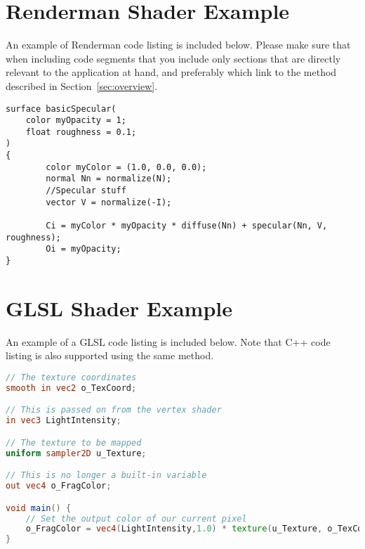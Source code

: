 \documentclass[]{acmsiggraph}
\begin{document}
\section{Renderman Shader Example}\label{app:renderman}
An example of Renderman code listing is included below. Please make sure that when including code segments that you include only sections that are directly relevant to the application at hand, and preferably which link to the method described in Section~\ref{sec:overview}.
\begin{lstlisting}[language=rendermansl, label={lst:renderman}, caption={Renderman example lifted from \protect\cite{renderman16}.}]
surface basicSpecular(
    color myOpacity = 1; 
    float roughness = 0.1;
)
{
        color myColor = (1.0, 0.0, 0.0);
        normal Nn = normalize(N);
        //Specular stuff
        vector V = normalize(-I);
        
        Ci = myColor * myOpacity * diffuse(Nn) + specular(Nn, V, roughness);
        Oi = myOpacity;
} 
\end{lstlisting}


\section{GLSL Shader Example}\label{app:glsl}
An example of a GLSL code listing is included below. Note that C++ code listing is also supported using the same method.

\begin{lstlisting}[language=GLSL, label={lst:glsl}, caption={A simple textured shader.}]
// The texture coordinates
smooth in vec2 o_TexCoord;

// This is passed on from the vertex shader
in vec3 LightIntensity;

// The texture to be mapped
uniform sampler2D u_Texture;

// This is no longer a built-in variable
out vec4 o_FragColor;

void main() {
    // Set the output color of our current pixel
    o_FragColor = vec4(LightIntensity,1.0) * texture(u_Texture, o_TexCoord);
}
\end{lstlisting}
\end{document}
